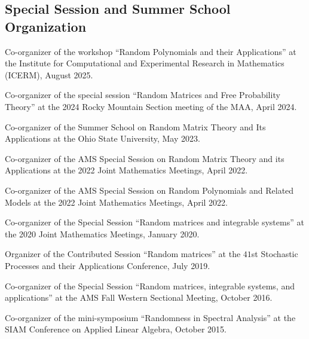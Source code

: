 \documentclass[letterpaper]{article}
\renewenvironment{itemize}{
  \begin{list}{}{
    \setlength{\leftmargin}{1em}
  }
}{
  \end{list}
}
\begin{document}
\subsection*{Special Session and Summer School Organization}
\begin{itemize}
	\item Co-organizer of the workshop ``Random Polynomials and their Applications'' at the Institute for Computational and Experimental Research in Mathematics (ICERM), August 2025. 
	\item Co-organizer of the special session ``Random Matrices and Free Probability Theory'' at the 2024 Rocky Mountain Section meeting of the MAA, April 2024. 
	\item Co-organizer of the Summer School on Random Matrix Theory and Its Applications at the Ohio State University, May 2023. 
	\item Co-organizer of the AMS Special Session on Random Matrix Theory and its Applications at the 2022 Joint Mathematics Meetings, April 2022.
	\item Co-organizer of the AMS Special Session on Random Polynomials and Related Models at the 2022 Joint Mathematics Meetings, April 2022. 
	\item Co-organizer of the Special Session ``Random matrices and integrable systems'' at the 2020 Joint Mathematics Meetings, January 2020.  
	\item Organizer of the Contributed Session ``Random matrices'' at the $41$st Stochastic Processes and their Applications Conference, July 2019.
	\item Co-organizer of the Special Session ``Random matrices, integrable systems, and applications'' at the AMS Fall Western Sectional Meeting, October 2016.
	\item Co-organizer of the mini-symposium ``Randomness in Spectral Analysis'' at the SIAM Conference on Applied Linear Algebra, October 2015.
\end{itemize}
\end{document}
